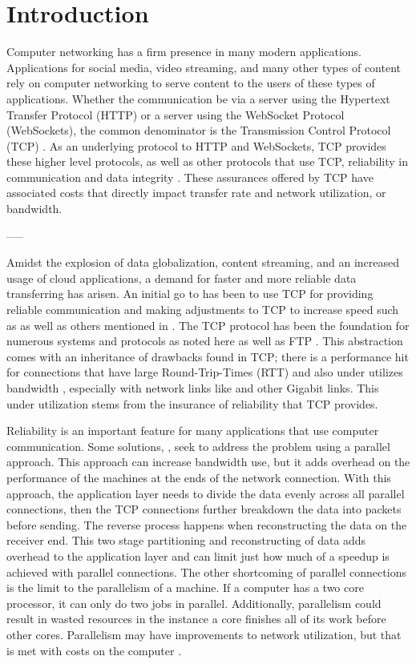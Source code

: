 \chapter{Introduction}

Computer networking has a firm presence in many modern applications. Applications for social media, video streaming, and many other types of content rely on computer networking to serve content to the users of these types of applications. Whether the communication be via a server using the Hypertext Transfer Protocol (HTTP) or a server using the WebSocket Protocol (WebSockets), the common denominator is the Transmission Control Protocol (TCP) \cite{fielding1999hypertext}\cite{fette2011websocket}. As an underlying protocol to HTTP and WebSockets, TCP provides these higher level protocols, as well as other protocols that use TCP, reliability in communication and data integrity \cite{cerf1978specification}. These assurances offered by TCP have associated costs that directly impact transfer rate and network utilization, or bandwidth.

-----

Amidst the explosion of data globalization, content streaming, and an increased usage of cloud applications, a demand for faster and more reliable data transferring has arisen. An initial go to has been to use TCP for providing reliable communication and making adjustments to TCP to increase speed such as \cite{brakmo1995tcp}\cite{wei2006fast}\cite{ha2008cubic} as well as others mentioned in \cite{ha2008cubic}\cite{He2002}. The TCP protocol has been the foundation for numerous systems and protocols as noted here \cite{Fan2010} as well as FTP \cite{Bhushan1972}. This abstraction comes with an inheritance of drawbacks found in TCP; there is a performance hit for connections that have large Round-Trip-Times (RTT) and also under utilizes bandwidth \cite{Fan2010}, especially with network links like \cite{Pfister2001} and other Gigabit links. This under utilization stems from the insurance of reliability that TCP provides.

Reliability is an important feature for many applications that use computer communication. Some solutions, \cite{Allman1995}\cite{Allman1997}\cite{Sivakumar2000psockets}, seek to address the problem using a parallel approach. This approach can increase bandwidth use, but it adds overhead on the performance of the machines at the ends of the network connection. With this approach, the application layer needs to divide the data evenly across all parallel connections, then the TCP connections further breakdown the data into packets before sending. The reverse process happens when reconstructing the data on the receiver end. This two stage partitioning and reconstructing of data adds overhead to the application layer and can limit just how much of a speedup is achieved with parallel connections. The other shortcoming of parallel connections is the limit to the parallelism of a machine. If a computer has a two core processor, it can only do two jobs in parallel. Additionally, parallelism could result in wasted resources in the instance a core finishes all of its work before other cores. Parallelism may have improvements to network utilization, but that is met with costs on the computer \cite{Leijen2009}.

